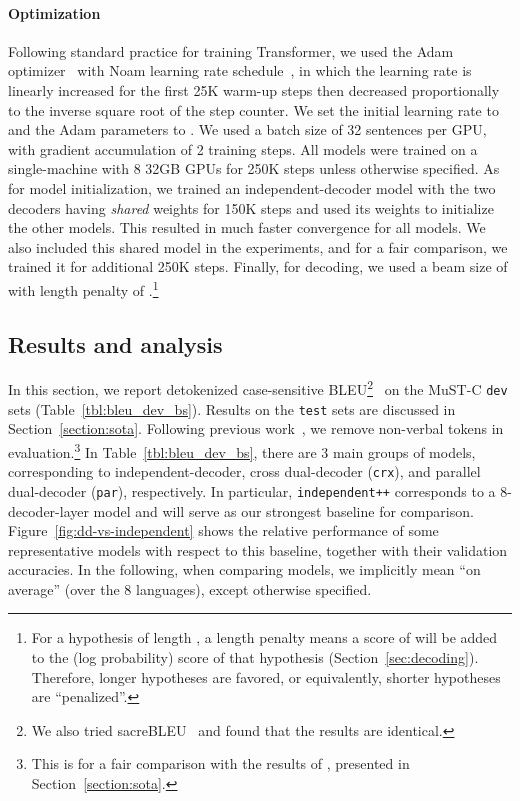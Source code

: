 \documentclass[11pt]{article}
\theoremstyle{plain}
\theoremstyle{definition}
\newcommand{\var}[1]{\texttt{#1}}
\begin{document}
\paragraph{Optimization}
Following standard practice for training Transformer, we used the Adam optimizer~\cite{kingma2015adam} with Noam learning rate schedule~\cite{vaswani2017attention}, in which the learning rate is linearly increased for the first 25K warm-up steps then decreased proportionally to the inverse square root of the step counter. We set the initial learning rate to  and the Adam parameters to . We used a batch size of 32 sentences per GPU, with gradient accumulation of 2 training steps. All models were trained on a single-machine with 8 32GB GPUs for 250K steps unless otherwise specified. As for model initialization, we trained an independent-decoder model with the two decoders having \emph{shared} weights for 150K steps and used its weights to initialize the other models. This resulted in much faster convergence for all models. We also included this shared model in the experiments, and for a fair comparison, we trained it for additional 250K steps. Finally, for decoding, we used a beam size of  with length penalty of .\footnote{For a hypothesis of length , a length penalty  means a score of  will be added to the (log probability) score of that hypothesis (Section~\ref{sec:decoding}). Therefore, longer hypotheses are favored, or equivalently, shorter hypotheses are ``penalized''.}


\subsection{Results and analysis}

In this section, we report detokenized case-sensitive BLEU\footnote{{We also tried sacreBLEU~\cite{post2018call} and found that the results are identical.}}~\cite{papineni2002bleu} on the MuST-C \var{dev} sets (Table~\ref{tbl:bleu_dev_bs}). Results on the \var{test} sets are discussed in Section~\ref{section:sota}. {Following previous work~\cite{inaguma2020espnet}, we remove non-verbal tokens in evaluation.\footnote{This is for a fair comparison with the results of , presented in Section~\ref{section:sota}.}} In Table~\ref{tbl:bleu_dev_bs}, there are 3 main groups of models, corresponding to independent-decoder, cross dual-decoder (\var{crx}), and parallel dual-decoder (\var{par}), respectively. In particular, \var{independent++} corresponds to a 8-decoder-layer model and will serve as our strongest baseline for comparison. Figure~\ref{fig:dd-vs-independent} shows the relative performance of some representative models with respect to this baseline, together with their validation accuracies. In the following, when comparing models, we implicitly mean ``on average'' (over the 8 languages), except otherwise specified.
\end{document}
